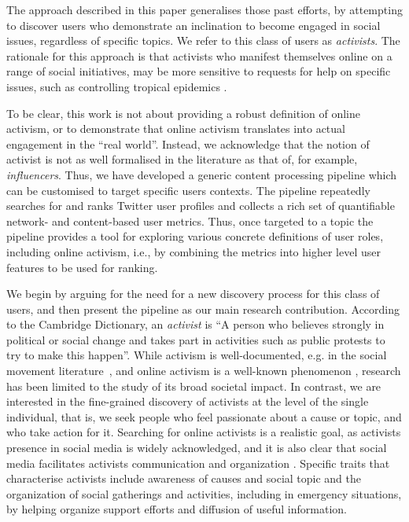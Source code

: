 \documentclass[runningheads]{llncs}
\begin{document}
The approach described in this paper generalises those past efforts, by attempting to discover users who demonstrate an inclination to become engaged in social issues, regardless of specific topics.
We refer to this class of users as \textit{activists}.
The rationale for this approach is that activists who manifest themselves online on a range of social initiatives, may be more sensitive to requests for help on specific issues, such as controlling tropical epidemics .

To be clear, this work is not about providing a robust definition of online activism, or to demonstrate that online activism translates into actual engagement in the ``real world''.
%
Instead, we acknowledge that the notion of activist is not as well formalised in the literature as that of, for example, \textit{influencers}. 
Thus, we have developed a generic content processing pipeline which can be customised to target specific users contexts. 
The pipeline repeatedly searches for and ranks Twitter user profiles and collects a rich set of quantifiable network- and content-based user metrics. 
Thus, once targeted to a topic the pipeline provides a tool for exploring various concrete definitions of user roles, including online activism, i.e., by combining the metrics into higher level user features to be used for ranking.

We begin by arguing for the need for a new discovery process for this class of users, and then present the pipeline as our main research contribution.
%
According to the Cambridge Dictionary, an \textit{activist} is ``A person who believes strongly in political or social change and takes part in activities such as public protests to try to make this happen''.
%
While activism is well-documented, e.g. in the social movement literature~\cite{doi:10.1080/14742830701497277}, and online activism is a well-known phenomenon \cite{IJoC1246}, research has been limited to the study of its broad societal impact. 
In contrast, we are interested in the fine-grained discovery of activists at the level of the single individual, that is, we seek people who feel passionate about a cause or topic, and who take action for it. 
Searching for online activists is a realistic goal, as activists presence in social media is widely acknowledged, and it is also clear that social media facilitates activists communication and organization \cite{Poell2014,Youmans2012}. 
Specific traits that characterise activists include awareness of causes and social topic and the organization of social gatherings and activities, including in emergency situations, by helping organize support efforts and diffusion of useful information.
 
\end{document}
